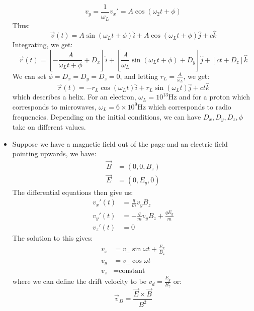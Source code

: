 \begin{itemize}
\begin{example}
\begin{equation}
            v_y = \frac{1}{\omega_L }v_x' = A\cos(\omega_2 t+\phi)
        \end{equation}
        Thus:
        \begin{equation}
            \vec{v}(t) = A\sin(\omega_L  t + \phi)\hat{i} + A\cos(\omega_L  t+\phi)\hat{j} + c\hat{k}
        \end{equation}
        Integrating, we get:
        \begin{equation}
            \vec{r}(t) = \left[- \frac{A}{\omega_L t + \phi} + D_x \right]\hat{i} + \left[\frac{A}{\omega_L}\sin(\omega_L t+\phi) + D_y\right]\hat{j} + [ct+D_z]\hat{k}
        \end{equation}
        We can set $\phi=D_x=D_y=D_z=0$, and letting $r_L = \frac{A}{\omega_L}$, we get:
        \begin{equation}
            \vec{r}(t) = -r_L\cos(\omega_L t)\hat{i} + r_L\sin(\omega_L t)\hat{j}+ct\hat{k}
        \end{equation}
        which describes a helix. For an electron, $\omega_L=10^{13} \si{\hertz}$ and for a proton which corresponds to microwaves, $\omega_L=6 \times 10^9 \si{\hertz}$ which corresponds to radio frequencies. Depending on the initial conditions, we can have $D_x,D_y,D_z,\phi$ take on different values.
    \end{example}
    \item Suppose we have a magnetic field out of the page and an electric field pointing upwards, we have:
    \begin{align}
        \vec{B} &= (0,0,B_z) \\
        \vec{E} &= (0,E_y,0) 
    \end{align}
    The differential equations then give us:
    \begin{align}
        v_x'(t) &= \frac{q}{m}v_y B_z \\ 
        v_y'(t) &= -\frac{q}{m}v_yB_z + \frac{qE_y}{m} \\ 
        v_z'(t) &= 0
    \end{align}
    The solution to this gives:
    \begin{align}
        v_x &= v_\perp \sin \omega t + \frac{E_x}{B_z} \\ 
        v_y &= v_\perp \cos \omega t \\ 
        v_z &= \text{constant}
    \end{align}
    where we can define the drift velocity to be $v_d = \frac{E_y}{B_z}$ or:
    \begin{equation}
        \vec{v}_D = \frac{\vec{E} \times \vec{B}}{B^2}
    \end{equation}
\end{itemize}